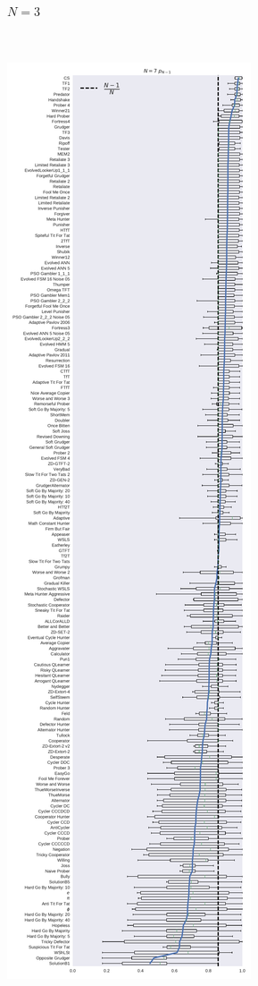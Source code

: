 \documentclass{article}
\begin{document}
\begin{figure}[!hbtp]
\begin{subfigure}{.3\textwidth}
        \caption{\(N=3\)}
        \label{fig:boxplot_3_resist}
    \end{subfigure}%
    ~
    \begin{subfigure}{.3\textwidth}
        \centering
        \includegraphics[height=.9\textheight]{./img/boxplot_7_resist.pdf}

\end{subfigure}
\end{figure}
\end{document}
